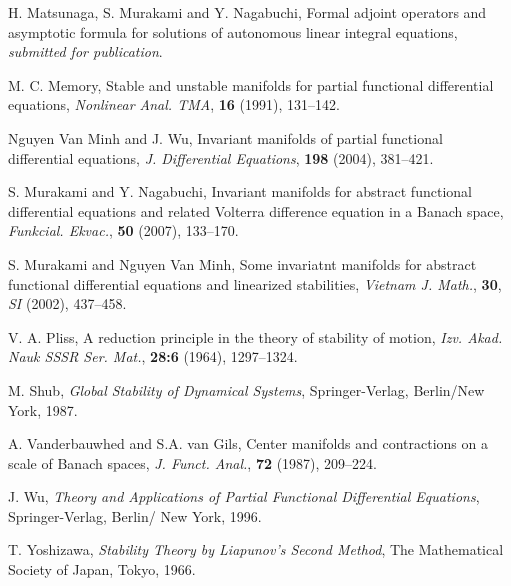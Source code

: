 \documentclass[12pt]{amsart}
\begin{document}
\begin{thebibliography}{10}
H. Matsunaga, S. Murakami and Y. Nagabuchi,
Formal adjoint operators and asymptotic formula for solutions of 
autonomous linear integral equations, 
{\it submitted for publication}.

M. C. Memory, Stable and unstable manifolds for partial functional 
differential equations, 
{\it Nonlinear Anal. TMA}, {\bf 16} (1991), 131--142.

Nguyen Van Minh and J. Wu, Invariant manifolds of partial functional
differential equations, 
{\it J. Differential Equations}, {\bf 198} (2004), 381--421.

S. Murakami and Y. Nagabuchi,
Invariant manifolds for abstract functional differential equations 
and related Volterra difference equation in a Banach space, 
{\it Funkcial. Ekvac.}, {\bf 50} (2007), 133--170.

S. Murakami and Nguyen Van Minh,
Some invariatnt manifolds for abstract functional differential equations 
and linearized stabilities, 
{\it Vietnam J. Math.}, {\bf 30}, {\sl SI} (2002), 437--458.

V. A. Pliss, A reduction principle in the theory of stability of motion, 
{\it Izv. Akad. Nauk SSSR Ser. Mat.}, {\bf 28:6} (1964), 1297--1324. 

M. Shub, {\it Global Stability of Dynamical Systems},
Springer-Verlag, Berlin/New York, 1987.

A. Vanderbauwhed and S.A. van Gils, 
Center manifolds and contractions on a scale of Banach spaces, 
{\it J. Funct. Anal.}, {\bf 72} (1987), 209--224.

J. Wu, {\it Theory and Applications of Partial Functional Differential 
Equations}, Springer-Verlag, Berlin/ New York, 1996.  

T. Yoshizawa,
{\it Stability Theory by Liapunov's Second Method},
The Mathematical Society of Japan, Tokyo, 1966.

\end{thebibliography}
\end{document}
